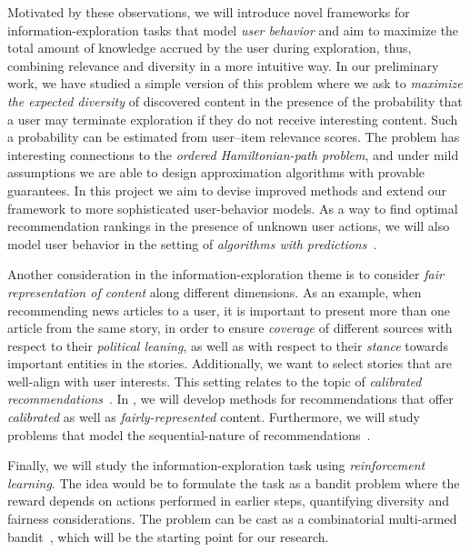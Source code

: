 \documentclass[a4paper,11pt]{article}
\begin{document}
Motivated by these observations, 
we will introduce novel frameworks for information-exploration tasks
that model \emph{user behavior} and aim to maximize 
the total amount of knowledge accrued by the user during exploration, 
thus, combining relevance and diversity in a more intuitive way.
In our preliminary work, we have studied a simple version 
of this problem where we ask to \emph{maximize the expected diversity} of discovered content
in the presence of the probability that a user 
may terminate exploration if they do not receive interesting content.
Such a probability can be estimated from user--item relevance scores.
The problem has interesting connections to the \emph{ordered Hamiltonian-path problem}, 
and under mild assumptions we are able to design approximation algorithms
with provable guarantees.
In this project we aim to devise improved methods
and extend our framework to more sophisticated user-behavior models.
As a way to find optimal recommendation rankings in the presence of unknown user actions, 
we will also model user behavior in the setting of 
\emph{algorithms with predictions}~\cite{mitzenmacher2022algorithms}.

Another consideration in the information-exploration theme
is to consider \emph{fair representation of content} along different dimensions. 
As an example, when recommending news articles to a user, 
it is important to present more than one article from the same story,
in order to ensure \emph{coverage} of different sources with respect to their \emph{political leaning}, 
as well as with respect to their \emph{stance} towards important entities in the stories. 
Additionally, we want to select stories that are well-align with user interests. 
This setting relates to the topic of \emph{calibrated recommendations}~\cite{wang2022improving}.
In \acronym, we will develop methods for recommendations that 
offer \emph{calibrated} as well as \emph{fairly-represented} content.
Furthermore, we will study problems that model the sequential-nature of recommendations~\cite{zhang2022ranking}.

Finally, we will study the information-exploration task using \emph{reinforcement learning}.
The idea would be to formulate the task as a bandit problem
where the reward depends on actions performed in earlier steps, 
quantifying diversity and fairness considerations. 
The problem can be cast as a combinatorial multi-armed bandit~\cite{chen2013combinatorial}, 
which will be the starting point for our research. 
\end{document}

